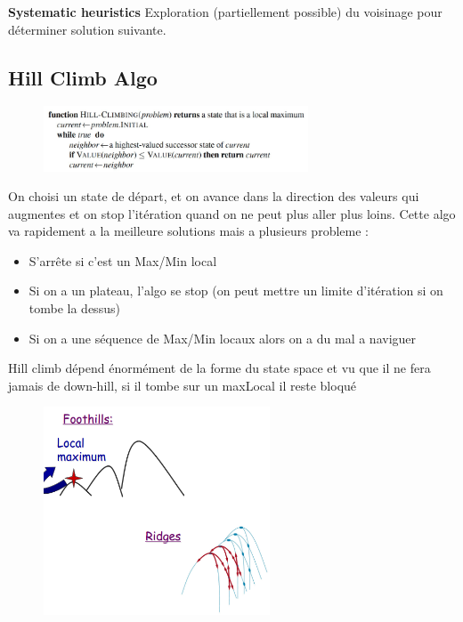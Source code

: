 		\textbf{Systematic heuristics}
		Exploration (partiellement possible) du voisinage  pour déterminer solution suivante.
		
	\subsection{Hill Climb Algo}
		\begin{figure}[htp]
			\centering
			\includegraphics[width=0.7\textwidth]{img/CodeHillClimb.png}
		\end{figure}
		On choisi un state de départ, et on avance dans la direction des valeurs qui augmentes et on stop l'itération quand on ne peut plus aller plus loins. Cette algo va rapidement a la meilleure  solutions mais a plusieurs probleme :
		\begin{itemize}
			\item S'arrête si c'est un Max/Min local
			\item Si on a un plateau, l'algo se stop (on peut mettre un limite d'itération si on tombe la dessus)
			\item Si on a une séquence de Max/Min locaux alors on a du mal a naviguer
		\end{itemize}
		
		Hill climb dépend énormément de la forme du state space et vu que il ne fera jamais de down-hill, si il tombe sur un maxLocal il reste bloqué
		
		\begin{figure}[htp]
			\centering
			\includegraphics[width=0.6\textwidth]{img/ProblemHillClimb.png}
		\end{figure}			
		
